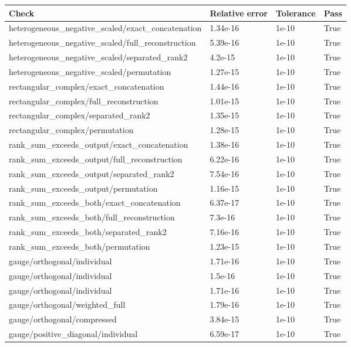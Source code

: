 \begin{tabular}{llll}
\hline
Check & Relative error & Tolerance & Pass \\
\hline
heterogeneous\_negative\_scaled/exact\_concatenation & 1.34e-16 & 1e-10 & True \\
heterogeneous\_negative\_scaled/full\_reconstruction & 5.39e-16 & 1e-10 & True \\
heterogeneous\_negative\_scaled/separated\_rank2 & 4.2e-15 & 1e-10 & True \\
heterogeneous\_negative\_scaled/permutation & 1.27e-15 & 1e-10 & True \\
rectangular\_complex/exact\_concatenation & 1.44e-16 & 1e-10 & True \\
rectangular\_complex/full\_reconstruction & 1.01e-15 & 1e-10 & True \\
rectangular\_complex/separated\_rank2 & 1.35e-15 & 1e-10 & True \\
rectangular\_complex/permutation & 1.28e-15 & 1e-10 & True \\
rank\_sum\_exceeds\_output/exact\_concatenation & 1.38e-16 & 1e-10 & True \\
rank\_sum\_exceeds\_output/full\_reconstruction & 6.22e-16 & 1e-10 & True \\
rank\_sum\_exceeds\_output/separated\_rank2 & 7.54e-16 & 1e-10 & True \\
rank\_sum\_exceeds\_output/permutation & 1.16e-15 & 1e-10 & True \\
rank\_sum\_exceeds\_both/exact\_concatenation & 6.37e-17 & 1e-10 & True \\
rank\_sum\_exceeds\_both/full\_reconstruction & 7.3e-16 & 1e-10 & True \\
rank\_sum\_exceeds\_both/separated\_rank2 & 7.16e-16 & 1e-10 & True \\
rank\_sum\_exceeds\_both/permutation & 1.23e-15 & 1e-10 & True \\
gauge/orthogonal/individual & 1.71e-16 & 1e-10 & True \\
gauge/orthogonal/individual & 1.5e-16 & 1e-10 & True \\
gauge/orthogonal/individual & 1.71e-16 & 1e-10 & True \\
gauge/orthogonal/weighted\_full & 1.79e-16 & 1e-10 & True \\
gauge/orthogonal/compressed & 3.84e-15 & 1e-10 & True \\
gauge/positive\_diagonal/individual & 6.59e-17 & 1e-10 & True \\

\end{tabular}
